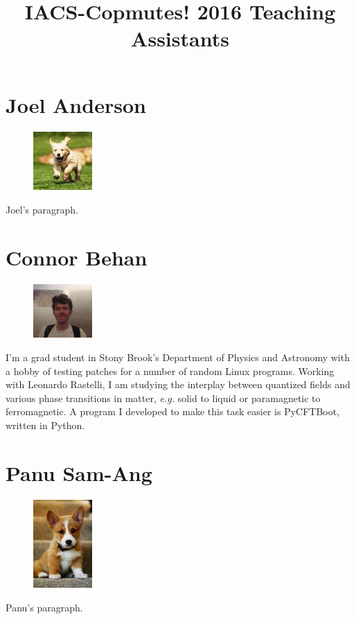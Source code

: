 \documentclass[]{article}
\begin{document}
\title{IACS-Copmutes! 2016 Teaching Assistants}

\section*{Joel Anderson} {
\begin{figure}
\begin{centering}
    \includegraphics[width=0.2\textwidth]{puppy.jpeg}
\end{centering}
\end{figure}
Joel's paragraph. }
\vspace{1.25 in}

\section*{Connor Behan} {
\begin{figure}
\begin{centering}
    \includegraphics[width=0.2\textwidth]{connor.jpg}
\end{centering}
\end{figure}
I'm a grad student in Stony Brook's Department of Physics and Astronomy with a hobby of testing patches for a number of random Linux programs. Working with Leonardo Rastelli, I am studying the interplay between quantized fields and various phase transitions in matter, \textit{e.g.} solid to liquid or paramagnetic to ferromagnetic. A program I developed to make this task easier is PyCFTBoot, written in Python. }
\vspace{1.25 in}

\section*{Panu Sam-Ang} {
\begin{figure}
\begin{centering}
    \includegraphics[width=0.2\textwidth]{puppy3.jpeg}
\end{centering}
\end{figure}
Panu's paragraph. }
\vspace{1.2 in}
\end{document}
